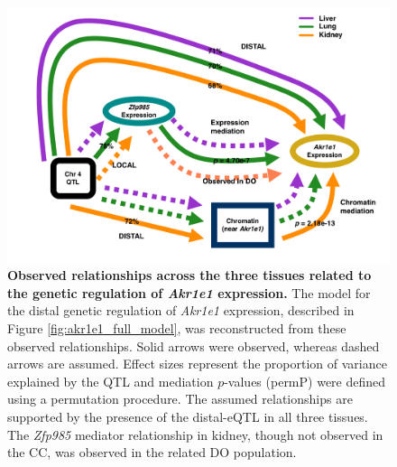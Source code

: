 \documentclass[9pt,twocolumn,twoside]{gsajnl}
\begin{document}
\begin{figure}[hp]
\renewcommand{\familydefault}{\sfdefault}\normalfont
\centering
\includegraphics[width=\textwidth, trim={0in 0in 0in 0in}, clip]{figs/akr1e1_observed_relationships.png}
\caption{\textbf{Observed relationships across the three tissues related to the genetic regulation of \textit{Akr1e1} expression.} 
The model for the distal genetic regulation of \textit{Akr1e1} expression, described in Figure \ref{fig:akr1e1_full_model}, was reconstructed from these observed relationships. Solid arrows were observed, whereas dashed arrows are assumed. Effect sizes represent the proportion of variance explained by the QTL and mediation $p$-values (permP) were defined using a permutation procedure. The assumed relationships are supported by the presence of the distal-eQTL in all three tissues. The \textit{Zfp985} mediator relationship in kidney, though not observed in the CC, was observed in the related DO population.
\label{fig:akr1e1_relationships}}
\end{figure}

\clearpage
\end{document}
